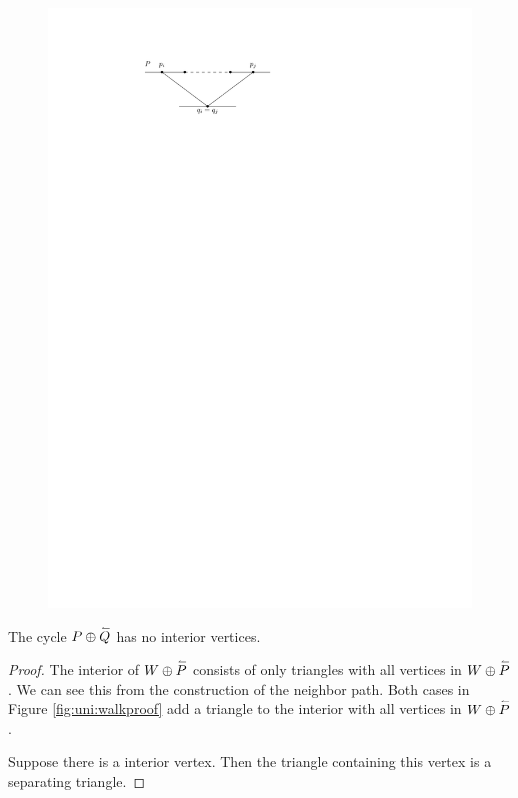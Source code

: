   \begin{figure}[h]
    \centering
    \includegraphics[scale=1]{unifiedAlgo/img/rightNeighbourwalk/neighborPathisPath.pdf}
    \caption{}
    \label{fig:right:path}
  \end{figure}

  \begin{lemma}
    \label{lm:uni:neighbourwalkNoInteriorVertex}
    The cycle $P \oplus \accentset{\leftharpoonup}{Q}$ has no interior vertices.
  \end{lemma}
  \begin{proof}
    The interior of $W \oplus \accentset{\leftharpoonup}{P}$ consists of only triangles with all vertices in $W \oplus \accentset{\leftharpoonup}{P}$. We can see this from the construction of the neighbor path. Both cases in Figure \ref{fig:uni:walkproof} add a triangle to the interior with all vertices in $W \oplus \accentset{\leftharpoonup}{P}$.

    Suppose there is a interior vertex. Then the triangle containing this vertex is a separating triangle.
  \end{proof}


